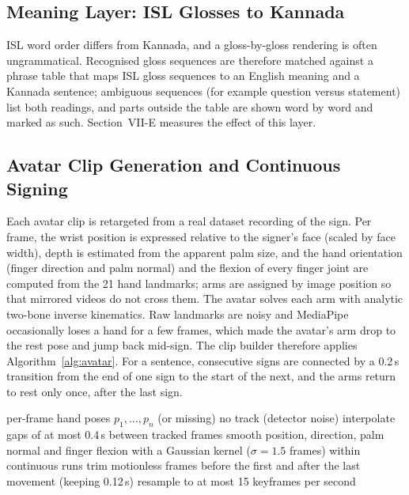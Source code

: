 \documentclass[conference]{IEEEtran}
\begin{document}
\subsection{Meaning Layer: ISL Glosses to Kannada}
ISL word order differs from Kannada, and a gloss-by-gloss rendering is often ungrammatical. Recognised gloss sequences are therefore matched against a phrase table that maps ISL gloss sequences to an English meaning and a Kannada sentence; ambiguous sequences (for example question versus statement) list both readings, and parts outside the table are shown word by word and marked as such. Section~VII-E measures the effect of this layer.

\subsection{Avatar Clip Generation and Continuous Signing}
Each avatar clip is retargeted from a real dataset recording of the sign. Per frame, the wrist position is expressed relative to the signer's face (scaled by face width), depth is estimated from the apparent palm size, and the hand orientation (finger direction and palm normal) and the flexion of every finger joint are computed from the 21 hand landmarks; arms are assigned by image position so that mirrored videos do not cross them. The avatar solves each arm with analytic two-bone inverse kinematics. Raw landmarks are noisy and MediaPipe occasionally loses a hand for a few frames, which made the avatar's arm drop to the rest pose and jump back mid-sign. The clip builder therefore applies Algorithm~\ref{alg:avatar}. For a sentence, consecutive signs are connected by a 0.2\,s transition from the end of one sign to the start of the next, and the arms return to rest only once, after the last sign.

\begin{algorithm}[t]
\caption{Avatar clip cleaning (per hand)}
\label{alg:avatar}
\begin{algorithmic}[1]
\REQUIRE per-frame hand poses $p_1, \ldots, p_n$ (or missing)
\RETURN no track (detector noise)
\ENDIF
\STATE interpolate gaps of at most 0.4\,s between tracked frames
\STATE smooth position, direction, palm normal and finger flexion with a Gaussian kernel ($\sigma=1.5$ frames) within continuous runs
\STATE trim motionless frames before the first and after the last movement (keeping 0.12\,s)
\STATE resample to at most 15 keyframes per second
\end{algorithmic}
\end{algorithm}
\end{document}
